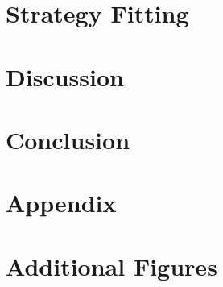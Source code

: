 \documentclass[a4paper,doc,natbib,floatsintext]{apa6}\usepackage[]{graphicx}\usepackage[]{color}
\begin{document}
\section{Strategy Fitting}

%


























\section{Discussion}




\section{Conclusion}


\section{Appendix}


\section{Additional Figures}




\end{document}
